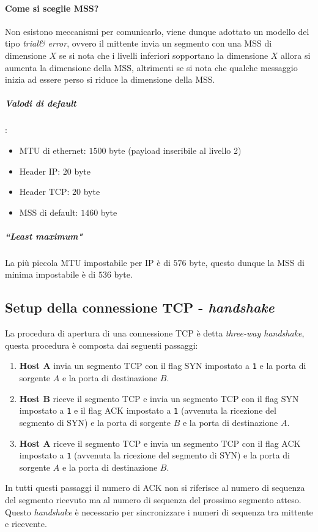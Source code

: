             \paragraph{Come si sceglie \Acrshort*{MSS}?} Non esistono meccanismi per comunicarlo, viene dunque adottato un modello del tipo \textit{trial\& error}, ovvero il mittente invia un segmento con una \Acrshort*{MSS} di dimensione $ X $ se si nota che i livelli inferiori sopportano la dimensione $ X $ allora si aumenta la dimensione della \Acrshort*{MSS}, altrimenti se si nota che qualche messaggio inizia ad essere perso si riduce la dimensione della \Acrshort*{MSS}.
                \subparagraph{Valodi di default}: \begin{itemize}
                    \item \Acrshort*{MTU} di ethernet: $ 1500 $ byte (payload inseribile al livello 2)
                    \item Header \Acrshort*{IP}: $ 20 $ byte
                    \item Header \Acrshort*{TCP}: $ 20 $ byte
                    \item \Acrshort*{MSS} di default: $ 1460 $ byte
                \end{itemize}
                \subparagraph{``\textit{Least maximum}"} La più piccola \Acrshort*{MTU} impostabile per \Acrshort*{IP} è di $ 576 $ byte, questo dunque la \Acrshort*{MSS} di minima impostabile è di $ 536 $ byte.
    \subsection[Setup della connessione \texttt{TCP} - \textit{handshake}]{Setup della connessione \Acrshort*{TCP} - \textit{handshake}}
        La procedura di apertura di una connessione \Acrshort*{TCP} è detta \textit{three-way handshake}, questa procedura è composta dai seguenti passaggi:
        \begin{enumerate}
            \item \textbf{Host A} invia un segmento \Acrshort*{TCP} con il flag \Acrshort*{SYN} impostato a \texttt{1} e la porta di sorgente $ A $ e la porta di destinazione $ B $.
            \item \textbf{Host B} riceve il segmento \Acrshort*{TCP} e invia un segmento \Acrshort*{TCP} con il flag \Acrshort*{SYN} impostato a \texttt{1} e il flag \Acrshort*{ACK} impostato a \texttt{1} (avvenuta la ricezione del segmento di \Acrshort*{SYN}) e la porta di sorgente $ B $ e la porta di destinazione $ A $.
            \item \textbf{Host A} riceve il segmento \Acrshort*{TCP} e invia un segmento \Acrshort*{TCP} con il flag \Acrshort*{ACK} impostato a \texttt{1} (avvenuta la ricezione del segmento di \Acrshort*{SYN}) e la porta di sorgente $ A $ e la porta di destinazione $ B $.
        \end{enumerate}
        In tutti questi passaggi il numero di \Acrshort*{ACK} non si riferisce al numero di sequenza del segmento ricevuto ma al numero di sequenza del prossimo segmento atteso. Questo \textit{handshake} è necessario per sincronizzare i numeri di sequenza tra mittente e ricevente.
